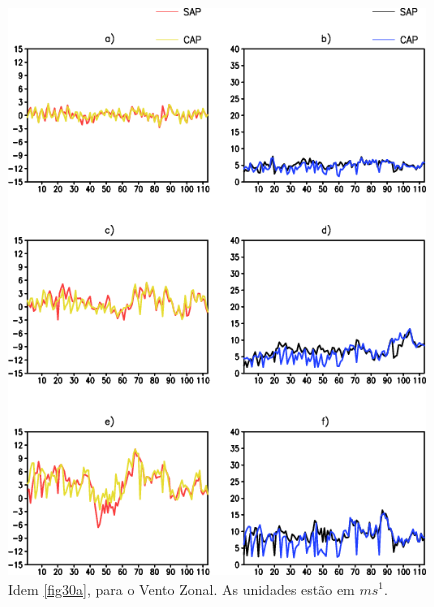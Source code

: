 \begin{figure}[!h]
\centering
\includegraphics[height=15cm]{./figs/vies_eqm-uvel.png}
\caption{Idem \autoref{fig30a}, para o Vento Zonal. As unidades estão em $ms^{1}$.}
\label{fig32a}
\end{figure}

\break

